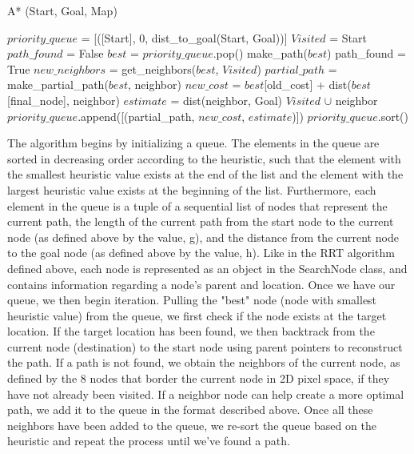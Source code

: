 \documentclass{article}
\begin{document}
\begin{algorithm}
\caption{A* (Start, Goal, Map)}\label{alg:cap}
\begin{algorithmic}[1]
\State $priority\_queue$ = [([Start], 0, dist\_to\_goal(Start, Goal))]
\State $Visited$ = {Start}
\State $path\_found$ = False
    \State $best$ = $priority\_queue$.pop()
        make\_path($best$)
        path\_found = True
    \EndIf
    \State $new\_neighbors$ = get\_neighbors($best$, $Visited$)
        \State $partial\_path$ = make\_partial\_path($best$, neighbor)
        \State $new\_cost$ = $best$[old\_cost] + dist($best$[final\_node], neighbor)
        \State $estimate$ = dist(neighbor, Goal)
        \State $Visited$ $\cup$ neighbor
        \State $priority\_queue$.append([(partial\_path, $new\_cost$, $estimate$)])
    \EndFor
    \State $priority\_queue$.sort()
\EndWhile

\end{algorithmic}
\end{algorithm}
The algorithm begins by initializing a queue. The elements in the queue are sorted in decreasing order according to the heuristic, such that the element with the smallest heuristic value exists at the end of the list and the element with the largest heuristic value exists at the beginning of the list. Furthermore, each element in the queue is a tuple of a sequential list of nodes that represent the current path, the length of the current path from the start node to the current node (as defined above by the value, g), and the distance from the current node to the goal node (as defined above by the value, h). Like in the RRT algorithm defined above, each node is represented as an object in the SearchNode class, and contains information regarding a node's parent and location. Once we have our queue, we then begin iteration. Pulling the "best" node (node with smallest heuristic value) from the queue, we first check if the node exists at the target location. If the target location has been found, we then backtrack from the current node (destination) to the start node using parent pointers to reconstruct the path. If a path is not found, we obtain the neighbors of the current node, as defined by the 8 nodes that border the current node in 2D pixel space, if they have not already been visited. If a neighbor node can help create a more optimal path, we add it to the queue in the format described above. Once all these neighbors have been added to the queue, we re-sort the queue based on the heuristic and repeat the process until we've found a path.\\   
\end{document}
